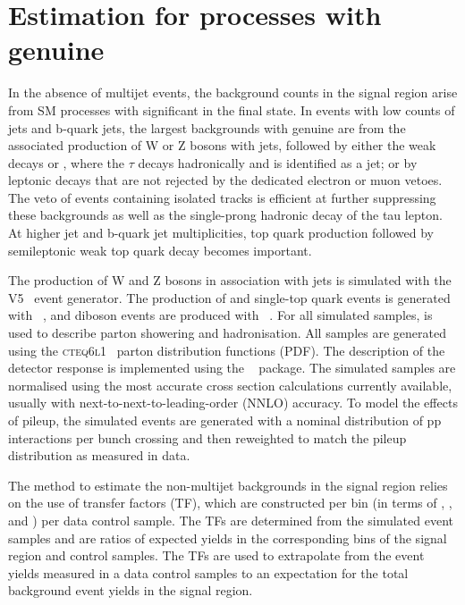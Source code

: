 
\section{Estimation for processes with genuine \met}


In the absence of multijet events, the background counts in the signal
region arise from SM processes with significant \met in the final
state. In events with low counts of jets and b-quark jets, the largest
backgrounds with genuine \met are from the associated production of W
or Z bosons with jets, followed by either the weak decays \znunu or
\wtaunu, where the $\tau$ decays hadronically and is identified as a
jet; or by leptonic decays that are not rejected by the dedicated
electron or muon vetoes. The veto of events containing isolated tracks
is efficient at further suppressing these backgrounds as well as the
single-prong hadronic decay of the tau lepton. At higher jet and
b-quark jet multiplicities, top quark production followed by
semileptonic weak top quark decay becomes important. 

The production of W and Z bosons in association with jets is simulated
with the \MADGRAPH V5~\cite{madgraph} event generator. The production
of \ttbar and single-top quark events is generated with
\POWHEG~\cite{powheg}, and diboson events are produced with
~\cite{pythia}. For all simulated samples,  is
used to describe parton showering and hadronisation. All samples are
generated using the \textsc{cteq6l1}~\cite{Pumplin:2002vw} parton
distribution functions (PDF). The description of the detector response
is implemented using the \GEANTfour~\cite{geant} package. The
simulated samples are normalised using the most accurate cross section
calculations currently available, usually with
next-to-next-to-leading-order (NNLO) accuracy. To model the effects of
pileup, the simulated events are generated with a nominal distribution
of pp interactions per bunch crossing and then reweighted to match the
pileup distribution as measured in data.

The method to estimate the non-multijet backgrounds in the signal
region relies on the use of transfer factors (TF), which are
constructed per bin (in terms of \njet, \nb, and \scalht) per data
control sample. The TFs are determined from the simulated event
samples and are ratios of expected yields in the corresponding bins of
the signal region and control samples. The TFs are used to extrapolate
from the event yields measured in a data control samples to an
expectation for the total background event yields in the signal
region. 


